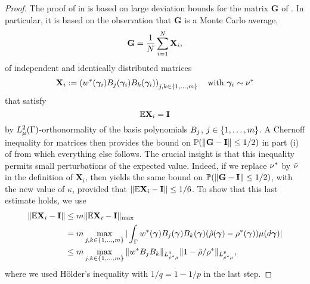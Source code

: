\begin{proof}
	The proof of  in \cite{cohen2016optimal} is based on large deviation bounds for the matrix $\mathbf{G}$ of . In particular, it is based on the observation that $\mathbf{G}$ is a Monte Carlo average,
	\begin{equation*}
	\mathbf{G}=\frac{1}{N}\sum_{i=1}^{N}\mathbf{X}_i,
	\end{equation*}
	of independent and identically distributed matrices
	\begin{equation*}
	\mathbf{X}_i:=\left(w^{*}(\bm{\gamma}_i)B_j(\bm{\gamma}_i)B_k(\bm{\gamma}_i)\right)_{j,k\in\{1,\dots,m\}} \quad \text{with }\bm{\gamma}_i\sim \nu^{*}
	\end{equation*}
	that satisfy
	\begin{equation*}
	\mathbb{E} \mathbf{X}_i=\mathbf{I}
	\end{equation*}
	by $L^2_{\mu}(\Gamma)$-orthonormality of the basis polynomials $B_j$, $j\in\{1,\dots,m\}$.
	A Chernoff inequality for matrices then provides the bound on $\mathbb{P}(\|{\mathbf{G}-\mathbf{I}}\|\leq 1/2)$ in part (i) of  from which everything else follows. The crucial insight is that this inequality permits small perturbations of the expected value. Indeed, if we replace $\nu^{*}$ by $\tilde{\nu}$ in the definition of $\mathbf{X}_i$, then  \cite[Theorem 1.1]{MR2946459} yields the same bound on $\mathbb{P}(\|{\mathbf{G}-\mathbf{I}}\|\leq 1/2)$, with the new value of $\kappa$, provided that $\|{\mathbb{E}\mathbf{X}_i-\mathbf{I}}\|\leq 1/6$. To show that this last estimate holds, we use
	\begin{equation*}
	\begin{split}\|{\mathbb{E}\mathbf{X}_i-\mathbf{I}}\|&\leq m\|\mathbb{E}\mathbf{X}_i-\mathbf{I}\|_{\text{max}}\\
	&=m\max_{j,k\in \{1,\dots,m\}}|\int_{\Gamma}w^{*}(\bm{\gamma})B_j(\bm{\gamma})B_k(\bm{\gamma})(\tilde{\rho}(\bm{\gamma})-\rho^{*}(\bm{\gamma}))\mu(d\bm{\gamma})|\\
	&\leq m\max_{j,k\in \{1,\dots,m\}}\|w^{*} B_jB_k\|_{L^q_{\rho^{*}\mu}}\|1-\tilde{\rho}/\rho^{*}\|_{L^{p}_{\rho^{*}\mu}},
	\end{split}
	\end{equation*}
	where we used Hölder's inequality with $1/q=1-1/p$ in the last step.


\end{proof}
